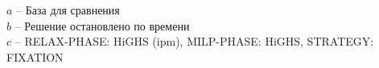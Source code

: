 \documentclass[%
	11pt,
	a4paper,
	utf8,
		]{article}
\begin{document}
{\begin{table}[!h]
	\end{table}
	\vspace*{-3mm}
\hspace*{5mm}$ a $ -- {\footnotesize База для сравнения}\\[-7mm]

\hspace*{5mm}$ b $ -- {\footnotesize Решение остановлено по времени}\\[-7mm]

\hspace*{5mm}$ c $ -- {\footnotesize RELAX-PHASE: HiGHS (ipm), MILP-PHASE: HiGHS, STRATEGY: FIXATION}
}

\vspace*{5mm}
\def\nVarsB{89608}
\def\nBinVarsB{0}
\def\nIntVarsB{2480}
\def\nConssB{87714}

\def\firstSolHighsObjB{1.0892041}  %
\def\firstSolHighsTimeB{12.8 / 60}
\def\firstSolZyoptObjB{1.0594730}  %
\def\firstSolZyoptTimeB{1.6 / 60}
\def\firstSolScipObjB{1.049621}  %
\def\firstSolScipTimeB{39 / 60}

\newcommand{\cplexObjB}{1.0479476651}
\newcommand{\highsObjB}{1.0486380}
\newcommand{\zyoptObjB}{1.0489574}
\newcommand{\scipObjB}{1.049621}
\newcommand{\cplexZyoptObjRelB}{(\fpeval{\cplexObjB} - \fpeval{\zyoptObjB}) / \fpeval{\cplexObjB} * 100}
\newcommand{\cplexHighsObjRelB}{(\fpeval{\cplexObjB} - \fpeval{\highsObjB}) / \fpeval{\cplexObjB} * 100}
\newcommand{\cplexScipObjRelB}{(\fpeval{\cplexObjB} - \fpeval{\scipObjB}) / \fpeval{\cplexObjB} * 100}
\end{document}
